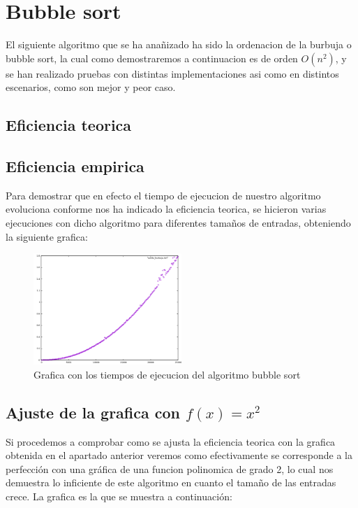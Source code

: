 \section{Bubble sort}
El siguiente algoritmo que se ha anañizado ha sido la ordenacion de la burbuja o bubble sort, la cual como demostraremos a continuacion es de orden $O(n^{2})$, y se han realizado pruebas con distintas implementaciones asi como en distintos escenarios, como son mejor y peor caso.

\subsection{Eficiencia teorica}


\subsection{Eficiencia empirica}
Para demostrar que en efecto el tiempo de ejecucion de nuestro algoritmo evoluciona conforme nos ha indicado la eficiencia teorica, se hicieron varias ejecuciones con dicho algoritmo para diferentes tamaños de entradas, obteniendo la siguiente grafica:

\begin{figure}[ht]
  \centering
  \includegraphics[width=0.5\textwidth]{./Imagenes/burbuja_pela.png}
  \caption{Grafica con los tiempos de ejecucion del algoritmo bubble sort}
\end{figure}


\subsection{Ajuste de la grafica con $f(x)=x^{2}$}
Si procedemos a comprobar como se ajusta la eficiencia teorica con la grafica obtenida en el apartado anterior veremos como efectivamente se corresponde a la perfección con una gráfica de una funcion polinomica de grado 2, lo cual nos demuestra lo inficiente de este algoritmo en cuanto el tamaño de las entradas crece. La grafica es la que se muestra a continuación:

